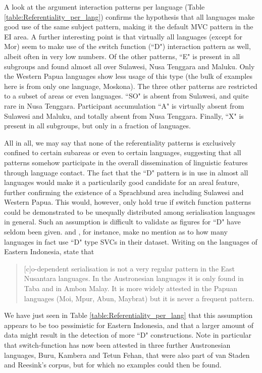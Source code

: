 A look at the argument interaction patterns per language (Table \ref{table:Referentiality_per_lang}) confirms the hypothesis that all languages make good use of the same subject pattern, making it the default MVC pattern in the EI area. A further interesting point is that virtually all languages (except for Mor) seem to make use of the switch function (``D") interaction pattern as well, albeit often in very low numbers. Of the other patterns, ``E" is present in all subgroups and found almost all over Sulawesi, Nusa Tenggara and Maluku. Only the Western Papua languages show less usage of this type (the bulk of examples here is from only one language, Moskona). The three other patterns are restricted to a subset of areas or even languages. ``SO" is absent from Sulawesi, and quite rare in Nusa Tenggara. Participant accumulation ``A" is virtually absent from Sulawesi and Maluku, and totally absent from Nusa Tenggara. Finally, ``X" is present in all subgroups, but only in a fraction of languages.

All in all, we may say that none of the referentiality patterns is exclusively confined to certain subareas or even to certain languages, suggesting that all patterns somehow participate in the overall dissemination of linguistic features through language contact. The fact that the ``D" pattern is in use in almost all languages would make it a particularily good candidate for an areal feature, further confirming the existence of a Sprachbund area including Sulawesi and Western Papua. This would, however, only hold true if switch function patterns could be demonstrated to be unequally distributed among serialisation languages in general. Such an assumption is difficult to validate as figures for ``D" have seldom been given. \textcite{Aikhenvald2006} and \textcite{Durie1997}, for instance, make no mention as to how many languages in fact use ``D" type SVCs in their dataset. Writing on the languages of Eastern Indonesia, \citet[26]{vanstaden2008serial} state that \begin{quote}[c]o-dependent serialisation is not a very regular pattern in the East Nusantara languages. In the Austronesian languages it is only found in Taba and in Ambon Malay. It is more widely attested in the Papuan languages (Moi, Mpur, Abun, Maybrat) but it is never a frequent pattern.\end{quote}
We have just seen in Table \ref{table:Referentiality_per_lang} that this assumption appears to be too pessimistic for Eastern Indonesia, and that a larger amount of data might result in the detection of more ``D" constructions. Note in particular that switch-function has now been attested in three further Austronesian languages, Buru, Kambera and Tetun Fehan, that were also part of van Staden and Reesink's corpus, but for which no examples could then be found.

